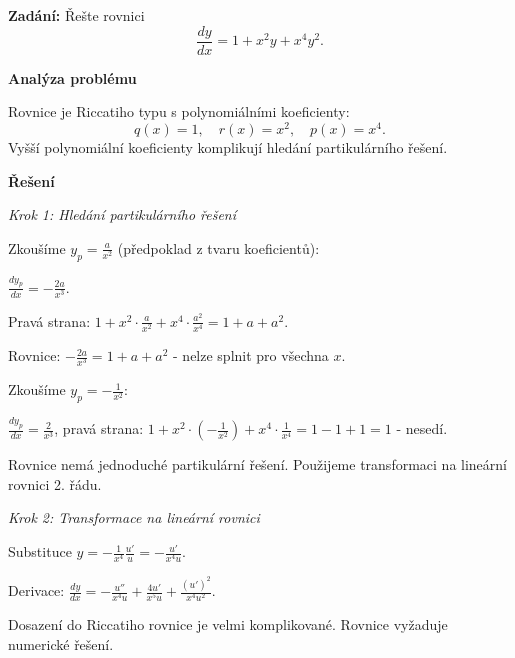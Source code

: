     \begin{example}
        \label{ex:l2-riccati-a2-slozity-vyssi-polynomy}
        
        \noindent\textbf{Zadání:} Řešte rovnici
        \[
        \frac{dy}{dx} = 1 + x^2 y + x^4 y^2.
        \]
        
        \vspace{1.5\baselineskip}
        
        \noindent\textbf{Analýza problému}
        
        \noindent Rovnice je Riccatiho typu s polynomiálními koeficienty:
        \[
        q(x) = 1, \quad r(x) = x^2, \quad p(x) = x^4.
        \]
        Vyšší polynomiální koeficienty komplikují hledání partikulárního řešení.
        
        \vspace{1.5\baselineskip}
        
        \noindent\textbf{Řešení}
        
        \noindent\textit{Krok 1: Hledání partikulárního řešení}
        
        Zkoušíme $y_p = \frac{a}{x^2}$ (předpoklad z tvaru koeficientů):
        
        $\frac{dy_p}{dx} = -\frac{2a}{x^3}$.
        
        Pravá strana: $1 + x^2\cdot\frac{a}{x^2} + x^4\cdot\frac{a^2}{x^4} = 1 + a + a^2$.
        
        Rovnice: $-\frac{2a}{x^3} = 1 + a + a^2$ - nelze splnit pro všechna $x$.
        
        Zkoušíme $y_p = -\frac{1}{x^2}$:
        
        $\frac{dy_p}{dx} = \frac{2}{x^3}$, pravá strana: $1 + x^2\cdot(-\frac{1}{x^2}) + x^4\cdot\frac{1}{x^4} = 1 - 1 + 1 = 1$ - nesedí.
        
        Rovnice nemá jednoduché partikulární řešení. Použijeme transformaci na lineární rovnici 2. řádu.
        
        \noindent\textit{Krok 2: Transformace na lineární rovnici}
        
        Substituce $y = -\frac{1}{x^4}\frac{u'}{u} = -\frac{u'}{x^4 u}$.
        
        Derivace: $\frac{dy}{dx} = -\frac{u''}{x^4 u} + \frac{4u'}{x^5 u} + \frac{(u')^2}{x^4 u^2}$.
        
        Dosazení do Riccatiho rovnice je velmi komplikované. Rovnice vyžaduje numerické řešení.
        

\end{example}

